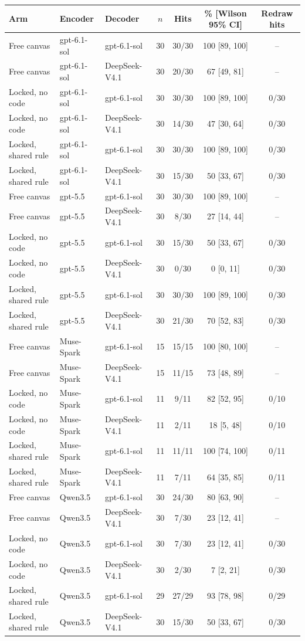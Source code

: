 \begin{longtable}{lllcccc}
\toprule
Arm & Encoder & Decoder & $n$ & Hits & \% [Wilson 95\% CI] & Redraw hits \\
\midrule
\endhead
Free canvas & gpt-6.1-sol & gpt-6.1-sol & 30 & 30/30 & 100 [89, 100] & -- \\
Free canvas & gpt-6.1-sol & DeepSeek-V4.1 & 30 & 20/30 & 67 [49, 81] & -- \\
Locked, no code & gpt-6.1-sol & gpt-6.1-sol & 30 & 30/30 & 100 [89, 100] & 0/30 \\
Locked, no code & gpt-6.1-sol & DeepSeek-V4.1 & 30 & 14/30 & 47 [30, 64] & 0/30 \\
Locked, shared rule & gpt-6.1-sol & gpt-6.1-sol & 30 & 30/30 & 100 [89, 100] & 0/30 \\
Locked, shared rule & gpt-6.1-sol & DeepSeek-V4.1 & 30 & 15/30 & 50 [33, 67] & 0/30 \\
Free canvas & gpt-5.5 & gpt-6.1-sol & 30 & 30/30 & 100 [89, 100] & -- \\
Free canvas & gpt-5.5 & DeepSeek-V4.1 & 30 & 8/30 & 27 [14, 44] & -- \\
Locked, no code & gpt-5.5 & gpt-6.1-sol & 30 & 15/30 & 50 [33, 67] & 0/30 \\
Locked, no code & gpt-5.5 & DeepSeek-V4.1 & 30 & 0/30 & 0 [0, 11] & 0/30 \\
Locked, shared rule & gpt-5.5 & gpt-6.1-sol & 30 & 30/30 & 100 [89, 100] & 0/30 \\
Locked, shared rule & gpt-5.5 & DeepSeek-V4.1 & 30 & 21/30 & 70 [52, 83] & 0/30 \\
Free canvas & Muse-Spark & gpt-6.1-sol & 15 & 15/15 & 100 [80, 100] & -- \\
Free canvas & Muse-Spark & DeepSeek-V4.1 & 15 & 11/15 & 73 [48, 89] & -- \\
Locked, no code & Muse-Spark & gpt-6.1-sol & 11 & 9/11 & 82 [52, 95] & 0/10 \\
Locked, no code & Muse-Spark & DeepSeek-V4.1 & 11 & 2/11 & 18 [5, 48] & 0/10 \\
Locked, shared rule & Muse-Spark & gpt-6.1-sol & 11 & 11/11 & 100 [74, 100] & 0/11 \\
Locked, shared rule & Muse-Spark & DeepSeek-V4.1 & 11 & 7/11 & 64 [35, 85] & 0/11 \\
Free canvas & Qwen3.5 & gpt-6.1-sol & 30 & 24/30 & 80 [63, 90] & -- \\
Free canvas & Qwen3.5 & DeepSeek-V4.1 & 30 & 7/30 & 23 [12, 41] & -- \\
Locked, no code & Qwen3.5 & gpt-6.1-sol & 30 & 7/30 & 23 [12, 41] & 0/30 \\
Locked, no code & Qwen3.5 & DeepSeek-V4.1 & 30 & 2/30 & 7 [2, 21] & 0/30 \\
Locked, shared rule & Qwen3.5 & gpt-6.1-sol & 29 & 27/29 & 93 [78, 98] & 0/29 \\
Locked, shared rule & Qwen3.5 & DeepSeek-V4.1 & 30 & 15/30 & 50 [33, 67] & 0/30 \\
\bottomrule
\end{longtable}
